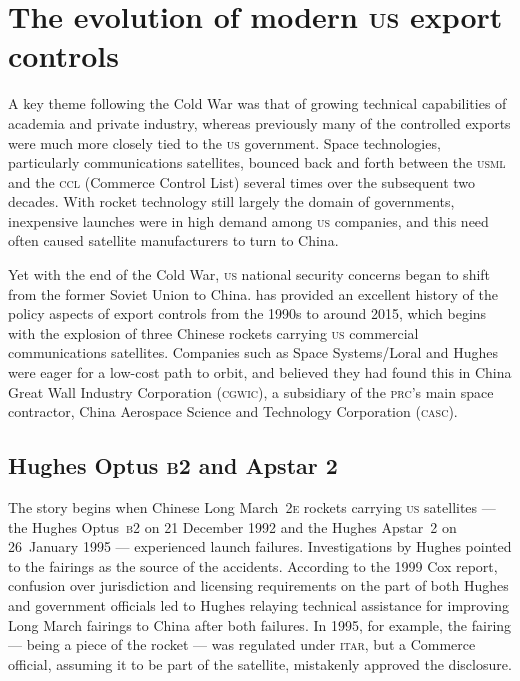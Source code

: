 \documentclass[12pt]{olfmemo}
\begin{document}
\section{The evolution of modern \textsc{us} export controls}
A key theme following the Cold War was that of growing technical capabilities of academia and private industry, whereas previously many of the controlled exports were much more closely tied to the \textsc{us} government. Space technologies, particularly communications satellites, bounced back and forth between the \textsc{usml} and the \textsc{ccl} (Commerce Control List) several times over the subsequent two decades. With rocket technology still largely the domain of governments, inexpensive launches were in high demand among \textsc{us} companies, and this need often caused satellite manufacturers to turn to China.

Yet with the end of the Cold War, \textsc{us} national security concerns began to shift from the former Soviet Union to China. \citet{Zinger2015} has provided an excellent history of the policy aspects of export controls from the 1990s to around 2015, which begins with the explosion of three Chinese rockets carrying \textsc{us} commercial communications satellites. Companies such as Space Systems/Loral and Hughes were eager for a low-cost path to orbit, and believed they had found this in China Great Wall Industry Corporation (\textsc{cgwic}), a subsidiary of the \textsc{prc}'s main space contractor, China Aerospace Science and Technology Corporation (\textsc{casc}).

\subsection{Hughes Optus \textsc{b2} and Apstar 2}
The story begins when Chinese Long March~\textsc{2e} rockets carrying \textsc{us} satellites --- the Hughes Optus~\textsc{b2} on 21 December 1992 and the Hughes Apstar~2 on 26~January 1995 --- experienced launch failures. Investigations by Hughes pointed to the fairings as the source of the accidents. According to the 1999 Cox report, confusion over jurisdiction and licensing requirements on the part of both Hughes and government officials led to Hughes relaying technical assistance for improving Long March fairings to China after both failures. In 1995, for example, the fairing --- being a piece of the rocket --- was regulated under \textsc{itar}, but a Commerce official, assuming it to be part of the satellite, mistakenly approved the disclosure. \citep{Cox1999} %
\end{document}
